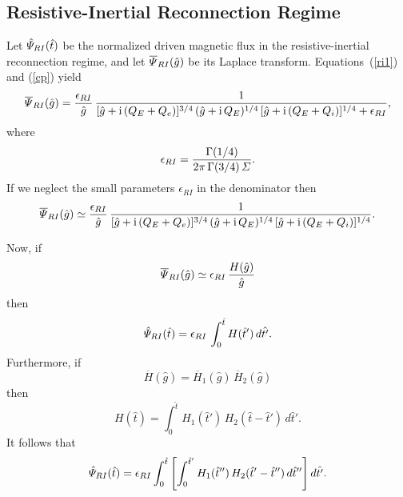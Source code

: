 \documentclass[12pt,prb,aps]{revtex4-1}
\begin{document}
\subsection{Resistive-Inertial Reconnection Regime}
Let $\hat{\mit\Psi}_{RI}(\hat{t})$ be the normalized driven magnetic flux in the resistive-inertial reconnection regime, and let $\overline{\mit\Psi}_{RI}(\hat{g})$ be its Laplace transform.
Equations~(\ref{ri1}) and (\ref{cp}) yield 
\begin{equation}
\overline{\mit\Psi}_{RI}(\hat{g}) =\frac{\epsilon_{RI}}{\hat{g}}\,\frac{1}{[\hat{g}+{\rm i}\,(Q_E+Q_e)]^{3/4}\,(\hat{g}+{\rm i}\,Q_E)^{1/4}\,[\hat{g}+ {\rm i}\,(Q_E+Q_i)]^{1/4}
+\epsilon_{RI}},
\end{equation}
where
\begin{equation}
\epsilon_{RI}= \frac{\Gamma(1/4)}{2\pi\,\Gamma(3/4)\,{\mit\Sigma}}.
\end{equation}
If we neglect the small parameters $\epsilon_{RI}$ in the denominator then
\begin{equation}
\overline{\mit\Psi}_{RI}(\hat{g}) \simeq\frac{\epsilon_{RI}}{\hat{g}}\,\frac{1}{[\hat{g}+{\rm i}\,(Q_E+Q_e)]^{3/4}\,(\hat{g}+{\rm i}\,Q_E)^{1/4}\,[\hat{g}+ {\rm i}\,(Q_E+Q_i)]^{1/4}}.
\end{equation}

Now, if
\begin{equation}
\overline{\mit\Psi}_{RI}(\hat{g}) \simeq \epsilon_{RI}\,\frac{H(\hat{g})}{\hat{g}}
\end{equation}
then
\begin{equation}
\hat{\mit\Psi}_{RI}(\hat{t}) = \epsilon_{RI}\,\int_0^{\hat{t}}H(\hat{t}')\,d\hat{t'}.
\end{equation}
Furthermore, if
\begin{equation}
\overline{H}(\hat{g}) = \overline{H}_1(\hat{g})\,\overline{H}_2(\hat{g})
\end{equation}
then
\begin{equation}
H(\hat{t})=\int_0^{\hat{t}}H_1(\hat{t}')\,H_2(\hat{t}-\hat{t}')\,d\hat{t}'.
\end{equation}
It follows that
\begin{equation}
\hat{\mit\Psi}_{RI}(\hat{t}) = \epsilon_{RI}\int_0^{\hat{t}}\left[\int_0^{\hat{t}'}
H_1(\hat{t}'')\,H_2(\hat{t}'-\hat{t}'')\,d\hat{t}''\right]d\hat{t'}.
\end{equation}
\end{document}
